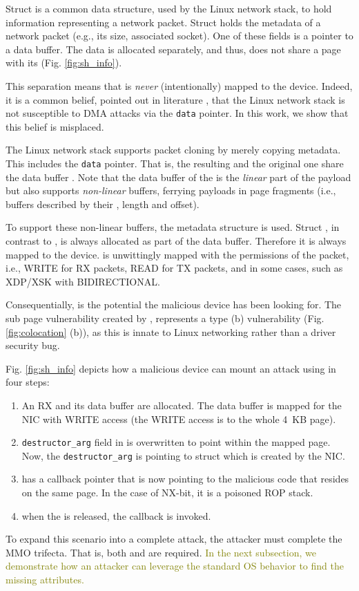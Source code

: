 Struct \skb{} is a common data structure, used by the Linux network stack, to hold information representing a network packet. Struct \skb{} holds the metadata of a network packet (e.g., its size, associated socket). One of these fields is a pointer to a data buffer. The data is allocated separately, and thus, does not share a page with its \skb{} (Fig. \ref{fig:sh_info}). 

This separation means that \skb{} is \emph{never} (intentionally) mapped to the device. Indeed, it is a common belief, pointed out in literature \cite{thunder}, that the Linux network stack is not susceptible to DMA attacks via the \texttt{data} pointer. In this work, we show that this belief is misplaced.

The Linux network stack supports packet cloning by merely copying \skb{} metadata. This includes the \texttt{data} pointer. That is, the resulting \skb{} and the original one share the data buffer \cite{drivers2005linux}. Note that the data buffer of the \skb{} is the \emph{linear} part of the payload but \skb{} also supports \emph{non-linear} buffers, ferrying payloads in page fragments (i.e., buffers described by their \page{}, length and offset). 

To support these non-linear buffers, the \shinfo{} metadata structure is used.
Struct \shinfo{}, in contrast to \skb{}, is always allocated as part of the data buffer. Therefore it is always mapped to the device. \shinfo is unwittingly mapped with the permissions of the packet, i.e., WRITE for RX packets, READ for TX packets, and in some cases, such as XDP/XSK \cite{xdp} with BIDIRECTIONAL.

Consequentially, \shinfo{} is the potential \oportunity{} the malicious device has been looking for. The sub page vulnerability created by \shinfo{}, represents a type (b) vulnerability (Fig. \ref{fig:colocation} (b)), as this is innate to Linux networking rather than a driver security bug. 

Fig. \ref{fig:sh_info} depicts how a malicious device can mount an attack using \shinfo{} in four steps:
\begin{enumerate}[label=(\alph*)]
    \item An RX \skb{} and its data buffer are allocated. The data buffer is mapped for the NIC with WRITE access (the WRITE access is to the whole 4~KB page). 
    \item \texttt{destructor\_arg} field in \shinfo{} is overwritten to point within the mapped page. Now, the \texttt{destructor\_arg} is pointing to struct \uarg{} which is created by the NIC.
    \item \uarg{} has a callback pointer that is now pointing to the malicious code that resides on the same page. In the case of NX-bit, it is a poisoned ROP stack.
    \item when the \skb{} is released, the callback is invoked.
\end{enumerate}
To expand this scenario into a complete attack, the attacker must complete the MMO trifecta. That is, both \means{} and \oportunity{} are required. \textcolor{olive}{In the next subsection, we demonstrate how an attacker can leverage the standard OS behavior to find the missing attributes.}

